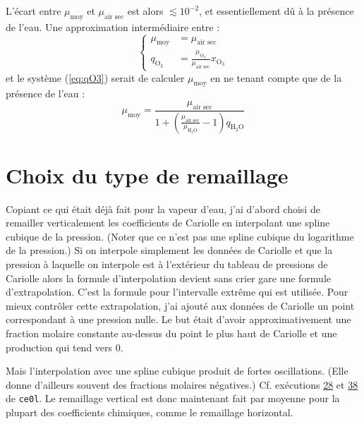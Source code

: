 \documentclass[a4paper,english,french]{article}
\begin{document}
L'écart entre $\mu_\mathrm{moy}$ et $\mu_\textrm{air sec}$ est alors
$\lesssim 10^{-2}$, et essentiellement dû à la présence de l'eau. Une
approximation intermédiaire entre :
\begin{displaymath}
  \left\{
    \begin{array}{ll}
      \mu_\mathrm{moy} & = \mu_\textrm{air sec} \\
      q_{\mathrm{O}_3} & = \frac{\mu_{\mathrm{O}_3}}{\mu_\textrm{air sec}}
      x_{\mathrm{O}_3}
    \end{array}
  \right.
\end{displaymath}
et le système (\ref{eq:qO3}) serait de calculer $\mu_\mathrm{moy}$ en
ne tenant compte que de la présence de l'eau :
\begin{displaymath}
  \mu_\mathrm{moy}
  =
  \frac{\mu_\textrm{air sec}}
  {1 +
    \left(
      \frac{\mu_\textrm{air sec}}{\mu_{\mathrm{H}_2\mathrm{O}}} - 1
    \right)
    q_{\mathrm{H}_2\mathrm{O}}}   
\end{displaymath}

\section{Choix du type de remaillage}

Copiant ce qui était déjà fait pour la vapeur d'eau, j'ai d'abord
choisi de remailler verticalement les coefficients de Cariolle en
interpolant une spline cubique de la pression. (Noter que ce n'est pas
une spline cubique du logarithme de la pression.) Si on interpole
simplement les données de Cariolle et que la pression à laquelle on
interpole est à l'extérieur du tableau de pressions de Cariolle alors
la formule d'interpolation devient sans crier gare une formule
d'extrapolation. C'est la formule pour l'intervalle extrême qui est
utilisée. Pour mieux contrôler cette extrapolation, j'ai ajouté aux
données de Cariolle un point correspondant à une pression nulle. Le
but était d'avoir approximativement une fraction molaire constante
au-dessus du point le plus haut de Cariolle et une production qui tend
vers 0.

Mais l'interpolation avec une spline cubique produit de fortes
oscillations. (Elle donne d'ailleurs souvent des fractions molaires
négatives.) Cf. exécutions
\href{file:///user/guez/Documents/Around_LMDZ/LMDZ_results.texfol/LMDZ_results.dvi}{28}
et
\href{file:///user/guez/Documents/Around_LMDZ/Around_LMDZE/Results_LMDZE_ce0l/check_coefoz_38.ps}{38}
de \verb+ce0l+. Le remaillage vertical est donc maintenant fait
par moyenne pour la plupart des coefficients chimiques, comme le
remaillage horizontal.
\end{document}
